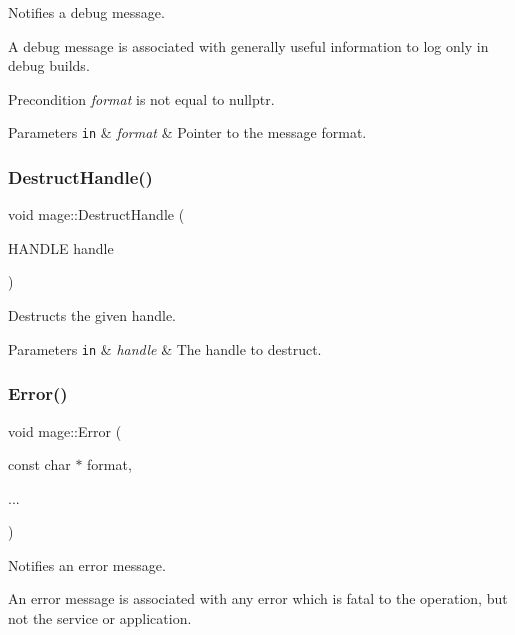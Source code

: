 Notifies a debug message.

A debug message is associated with generally useful information to log only in debug builds.

\begin{DoxyPrecond}{Precondition}
{\itshape format} is not equal to {\ttfamily nullptr}. 
\end{DoxyPrecond}

\begin{DoxyParams}[1]{Parameters}
\mbox{\tt in}  & {\em format} & Pointer to the message format. \\
\hline
\end{DoxyParams}
\hypertarget{namespacemage_a7bf12816896ea8d126d397f0c6d571b1}{}\label{namespacemage_a7bf12816896ea8d126d397f0c6d571b1} 
\subsubsection{\texorpdfstring{Destruct\+Handle()}{DestructHandle()}}
{\footnotesize\ttfamily void mage\+::\+Destruct\+Handle (\begin{DoxyParamCaption}\item[{H\+A\+N\+D\+LE}]{handle }\end{DoxyParamCaption})}

Destructs the given handle.


\begin{DoxyParams}[1]{Parameters}
\mbox{\tt in}  & {\em handle} & The handle to destruct. \\
\hline
\end{DoxyParams}
\hypertarget{namespacemage_a52a7fe8c9ce39afd9e0b0299373db0fa}{}\label{namespacemage_a52a7fe8c9ce39afd9e0b0299373db0fa} 
\subsubsection{\texorpdfstring{Error()}{Error()}}
{\footnotesize\ttfamily void mage\+::\+Error (\begin{DoxyParamCaption}\item[{const char $\ast$}]{format,  }\item[{}]{... }\end{DoxyParamCaption})}

Notifies an error message.

An error message is associated with any error which is fatal to the operation, but not the service or application.

